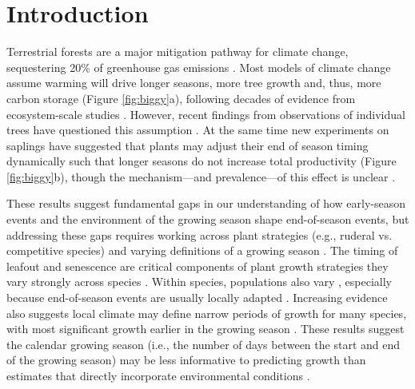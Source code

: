 \documentclass{article}[12pt]
\begin{document}
\clearpage
\section{Introduction}
Terrestrial forests are a major mitigation pathway for climate change, sequestering 20\% of greenhouse gas emissions \citep{roe2021}. Most models of climate change assume warming will drive longer seasons, more tree growth and, thus, more carbon storage (Figure \ref{fig:biggy}a), following decades of evidence from ecosystem-scale studies \citep{White1999,Keenan2014}. 
However, recent findings from  observations of individual trees have questioned this assumption \citep{dow2022warm,silvestro2023longer}. At the same time new experiments on saplings have suggested that plants may adjust their end of season timing dynamically such that longer seasons do not increase total productivity (Figure \ref{fig:biggy}b), though the mechanism---and prevalence---of this effect is unclear \citep{Zani2020,Norby2021,Zohner2023}.

These results suggest fundamental gaps in our understanding of how early-season events and the environment of the growing season shape end-of-season events, but addressing these gaps requires working across plant strategies (e.g., ruderal vs. competitive species) and varying definitions of a growing season \citep{Korner2023}. The timing of leafout and senescence are critical components of plant growth strategies they vary strongly across species \citep{Grime:1977sw}. Within species, populations also vary \citep{aitken2016}, especially because end-of-season events are usually locally adapted %
\citep[e.g. budset][]{bauerle2012photoperiodic,soolanayakanahally2013timing}. Increasing evidence also suggests local climate may define narrow periods of growth for many species, with most significant growth earlier in the growing season \cite{Zohner2023}. These results suggest the calendar growing season (i.e., the number of days between the start and end of the growing season) may be less informative to predicting growth than estimates that directly incorporate environmental conditions \citep{Korner2023}.
\end{document}
